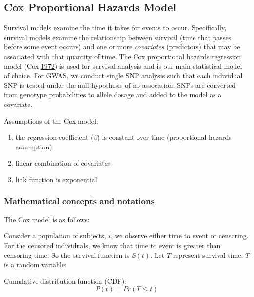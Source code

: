\documentclass[]{DissertateOSU}
\providecommand{\tightlist}{%
  \setlength{\itemsep}{0pt}\setlength{\parskip}{0pt}}
\begin{document}
\subsection{Cox Proportional Hazards
Model}\label{cox-proportional-hazards-model}

Survival models examine the time it takes for events to occur.
Specifically, survival models examine the relationship between survival
(time that passes before some event occurs) and one or more
\emph{covariates} (predictors) that may be associated with that quantity
of time. The Cox proportional hazards regression model (Cox
\protect\hyperlink{ref-cox1972}{1972}) is used for survival analysis and
is our main statistical model of choice. For GWAS, we conduct single SNP
analysis such that each individual SNP is tested under the null
hypothesis of no assocation. SNPs are converted from genotype
probabilities to allele dosage and added to the model as a covariate.

\noindent Assumptions of the Cox model:

\begin{enumerate}
\def\labelenumi{\arabic{enumi}.}
\tightlist
\item
  the regression coefficient (\(\beta\)) is constant over time
  (proportional hazards assumption)\\
\item
  linear combination of covariates\\
\item
  link function is exponential
\end{enumerate}

\subsubsection{Mathematical concepts and
notations}\label{mathematical-concepts-and-notations}

\noindent The Cox model is as follows:

Consider a population of subjects, \(i\), we observe either time to
event or censoring. For the censored individuals, we know that time to
event is greater than censoring time. So the survival function is
\(S(t)\). Let \(T\) represent survival time. \(T\) is a random variable:

\noindent Cumulative distribution function (CDF):\\

\begin{equation} \label{eq1}
P(t) = Pr(T \leq t) 
\end{equation}
\end{document}
